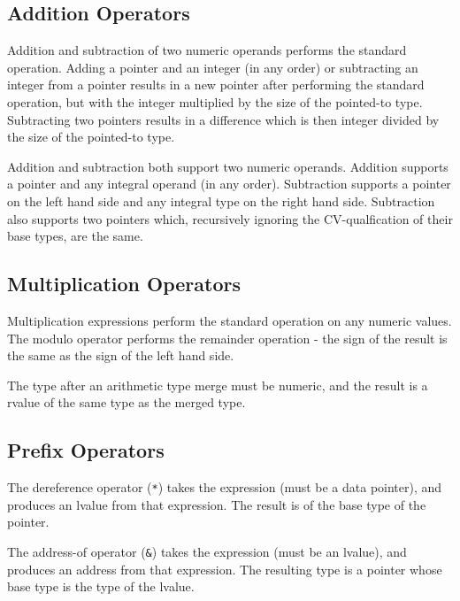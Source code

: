 \documentclass[letterpaper,12pt]{book}
\begin{document}
\subsection{Addition Operators}



Addition and subtraction of two numeric operands performs the standard operation. Adding a pointer and an integer (in any order) or subtracting an integer from a pointer results in a new pointer after performing the standard operation, but with the integer multiplied by the size of the pointed-to type. Subtracting two pointers results in a difference which is then integer divided by the size of the pointed-to type.

Addition and subtraction both support two numeric operands. Addition supports a pointer and any integral operand (in any order). Subtraction supports a pointer on the left hand side and any integral type on the right hand side. Subtraction also supports two pointers which, recursively ignoring the CV-qualfication of their base types, are the same.

\subsection{Multiplication Operators}



Multiplication expressions perform the standard operation on any numeric values. The modulo operator performs the remainder operation - the sign of the result is the same as the sign of the left hand side.

The type after an arithmetic type merge must be numeric, and the result is a rvalue of the same type as the merged type.

\subsection{Prefix Operators}



The dereference operator (\texttt{*}) takes the expression (must be a data pointer), and produces an lvalue from that expression. The result is of the base type of the pointer.

The address-of operator (\texttt{\&}) takes the expression (must be an lvalue), and produces an address from that expression. The resulting type is a pointer whose base type is the type of the lvalue.
\end{document}
